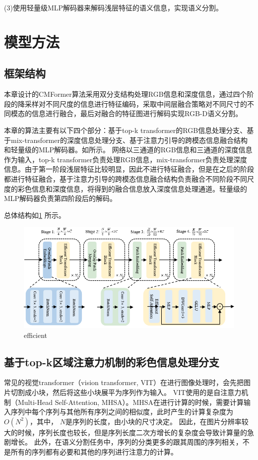 (3)使用轻量级MLP解码器来解码浅层特征的语义信息，实现语义分割。



\section{模型方法}



\subsection{框架结构}
本章设计的CMFormer算法采用双分支结构处理RGB信息和深度信息，通过四个阶段的降采样对不同尺度的信息进行特征编码，采取中间层融合策略对不同尺寸的不同模态的信息进行融合，最后对融合的特征图进行解码实现RGB-D语义分割。

本章的算法主要有以下四个部分：基于top-k transformer的RGB信息处理分支、基于mix-transformer的深度信息处理分支、基于注意力引导的跨模态信息融合结构和轻量级的MLP解码器。如所示。
网络以三通道的RGB信息和三通道的深度信息作为输入，top-k transformer负责处理RGB信息，mix-transformer负责处理深度信息。由于第一阶段浅层特征比较明显，因此不进行特征融合，但是在之后的阶段都进行特征融合，基于注意力引导的跨模态信息融合结构负责融合不同阶段不同尺度的彩色信息和深度信息，将得到的融合信息放入深度信息处理通道。轻量级的MLP解码器负责第四阶段后的解码。


总体结构如\ref{图：efficient} 所示。
\begin{figure}[h]
	\centering
	\includegraphics[width=\textwidth]{figures/efficient.png}
	\caption{efficient}
	\label{图：efficient}
\end{figure}


\subsection{基于top-k区域注意力机制的彩色信息处理分支}
常见的视觉transformer（vision transformer, VIT）在进行图像处理时，会先把图片切割成小块，然后将这些小块展平为序列作为输入。
VIT使用的是自注意力机制（Multi-Head Self-Attention, MHSA）。MHSA在进行计算的时候，需要计算输入序列中每个序列与其他所有序列之间的相似度，此时产生的计算复杂度为$O(N^2)$，其中， $N$是序列的长度，由小块的尺寸决定。
因此，在图片分辨率较大的时候，序列长度也较长，但是序列长度二次方增长的复杂度会导致计算量的急剧增长。
此外，在语义分割任务中，序列的分类更多的跟其周围的序列相关，不是所有的序列都有必要和其他的序列进行注意力的计算。


